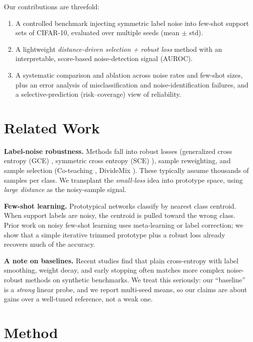 \documentclass{article}
\begin{document}
Our contributions are threefold:
\begin{enumerate}
  \item A controlled benchmark injecting symmetric label noise into few-shot support sets of
        CIFAR-10, evaluated over multiple seeds (mean $\pm$ std).
  \item A lightweight \emph{distance-driven selection + robust loss} method with an
        interpretable, score-based noise-detection signal (AUROC).
  \item A systematic comparison and ablation across noise rates and few-shot sizes, plus an
        error analysis of misclassification and noise-identification failures, and a
        selective-prediction (risk--coverage) view of reliability.
\end{enumerate}

\section{Related Work}
\label{sec:related}

\textbf{Label-noise robustness.} Methods fall into robust losses (generalized cross entropy
(GCE) \citep{zhang2018gce}, symmetric cross entropy (SCE) \citep{wang2019sce}), sample
reweighting, and sample selection (Co-teaching \citep{han2018coteaching}, DivideMix
\citep{li2020dividemix}). These typically assume thousands of samples per class. We
transplant the \emph{small-loss} idea into prototype space, using \emph{large distance} as
the noisy-sample signal.

\textbf{Few-shot learning.} Prototypical networks \citep{snell2017protonet} classify by
nearest class centroid. When support labels are noisy, the centroid is pulled toward the
wrong class. Prior work on noisy few-shot learning uses meta-learning or label correction; we
show that a simple iterative trimmed prototype plus a robust loss already recovers much of
the accuracy.

\textbf{A note on baselines.} Recent studies find that plain cross-entropy with label
smoothing, weight decay, and early stopping often matches more complex noise-robust methods
on synthetic benchmarks. We treat this seriously: our ``baseline'' is a \emph{strong} linear
probe, and we report multi-seed means, so our claims are about gains over a well-tuned
reference, not a weak one.

\section{Method}
\label{sec:method}
\end{document}
